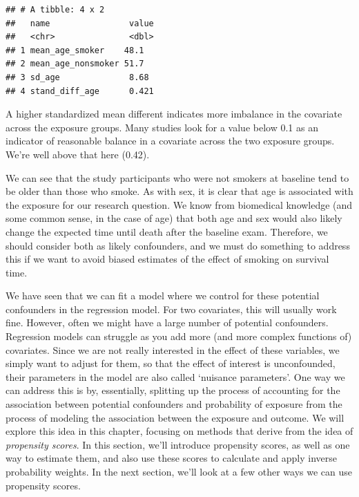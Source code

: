 \documentclass[
]{book}
\begin{document}
\begin{verbatim}
## # A tibble: 4 x 2
##   name                value
##   <chr>               <dbl>
## 1 mean_age_smoker    48.1  
## 2 mean_age_nonsmoker 51.7  
## 3 sd_age              8.68 
## 4 stand_diff_age      0.421
\end{verbatim}

A higher standardized mean different indicates more imbalance in the covariate across the exposure groups. Many studies look for a value below 0.1 as an indicator of reasonable balance in a covariate across the two exposure groups. We're well above that here (0.42).

We can see that the study participants who were not smokers at baseline tend to be older than those who smoke. As with sex, it is clear that age is associated with the exposure for our research question. We know from biomedical knowledge (and some common sense, in the case of age) that both age and sex would also likely change the expected time until death after the baseline exam. Therefore, we should consider both as likely confounders, and we must do something to address this if we want to avoid biased estimates of the effect of smoking on survival time.

We have seen that we can fit a model where we control for these potential confounders in the regression model. For two covariates, this will usually work fine. However, often we might have a large number of potential confounders. Regression models can struggle as you add more (and more complex functions of) covariates. Since we are not really interested in the effect of these variables, we simply want to adjust for them, so that the effect of interest is unconfounded, their parameters in the model are also called `nuisance parameters'. One way we can address this is by, essentially, splitting up the process of accounting for the association between potential confounders and probability of exposure from the process of modeling the association between the exposure and outcome. We will explore this idea in this chapter, focusing on methods that derive from the idea of \emph{propensity scores}. In this section, we'll introduce propensity scores, as well as one way to estimate them, and also use these scores to calculate and apply inverse probability weights. In the next section, we'll look at a few other ways we can use propensity scores.
\end{document}
